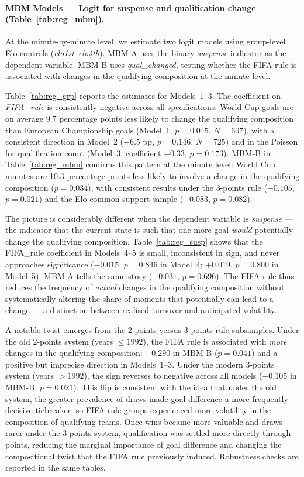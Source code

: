 \documentclass[11pt]{article}
\begin{document}
\paragraph{MBM Models — Logit for suspense and qualification change (Table~\ref{tab:reg_mbm}).}
At the minute-by-minute level, we estimate two logit models using group-level Elo controls (\textit{elo1st}--\textit{elo4th}). MBM-A uses the binary \textit{suspense} indicator as the dependent variable. MBM-B uses \textit{qual\_changed}, testing whether the FIFA rule is associated with changes in the qualifying composition at the minute level.

Table~\ref{tab:reg_grp} reports the estimates for Models~1--3. The coefficient on \textit{FIFA\_rule} is consistently negative across all specifications: World Cup goals are on average 9.7 percentage points less likely to change the qualifying composition than European Championship goals (Model~1, $p = 0.045$, $N = 607$), with a consistent direction in Model~2 ($-6.5$ pp, $p = 0.146$, $N = 725$) and in the Poisson for qualification count (Model~3, coefficient $-0.33$, $p = 0.173$). MBM-B in Table~\ref{tab:reg_mbm} confirms this pattern at the minute level: World Cup minutes are 10.3 percentage points less likely to involve a change in the qualifying composition ($p = 0.034$), with consistent results under the 3-points rule ($-0.105$, $p = 0.021$) and the Elo common support sample ($-0.083$, $p = 0.082$).

The picture is considerably different when the dependent variable is \textit{suspense} — the indicator that the current state is such that one more goal \textit{would} potentially change the qualifying composition. Table~\ref{tab:reg_susp} shows that the FIFA\_rule coefficient in Models~4--5 is small, inconsistent in sign, and never approaches significance ($-0.015$, $p = 0.846$ in Model~4; $+0.019$, $p = 0.800$ in Model~5). MBM-A tells the same story ($-0.031$, $p = 0.696$). The FIFA rule thus reduces the frequency of \textit{actual} changes in the qualifying composition without systematically altering the share of moments that potentially can lead to a change — a distinction between realised turnover and anticipated volatility.

A notable twist emerges from the 2-points versus 3-points rule subsamples. Under the old 2-points system (years $\le 1992$), the FIFA rule is associated with \textit{more} changes in the qualifying composition: $+0.290$ in MBM-B ($p = 0.041$) and a positive but imprecise direction in Models~1--3. Under the modern 3-points system (years $> 1992$), the sign reverses to negative across all models ($-0.105$ in MBM-B, $p = 0.021$). This flip is consistent with the idea that under the old system, the greater prevalence of draws made goal difference a more frequently decisive tiebreaker, so FIFA-rule groups experienced more volatility in the composition of qualifying teams. Once wins became more valuable and draws rarer under the 3-points system, qualification was settled more directly through points, reducing the marginal importance of goal difference and changing the compositional twist that the FIFA rule previously induced. Robustness checks are reported in the same tables.
\end{document}
